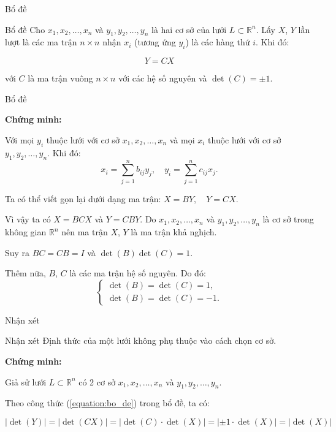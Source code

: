 \documentclass{beamer}
\numberwithin{equation}{section}
\begin{document}
\begin{frame}{Bổ đề}
\begin{block}{Bổ đề}
Cho $x_1, x_2, \ldots, x_n$ và $y_1, y_2, \ldots, y_n$ là hai cơ sở của lưới $L \subset \mathbb{R}^n$.
Lấy $X$, $Y$ lần lượt là các ma trận $n \times n$ nhận $x_i$ (tương ứng $y_i$) là các hàng thứ $i$.
Khi đó:

\begin{equation} \label{equation:bo_de}
Y = CX
\end{equation}

với $C$ là ma trận vuông $n \times n$ với các hệ số nguyên
và $\det(C) = \pm 1$.
\end{block}
\end{frame}
\begin{frame}{Bổ đề}

\textbf{Chứng minh:}

Với mọi $y_i$ thuộc lưới với cơ sở $x_1, x_2, \ldots, x_n$ và mọi $x_i$ thuộc lưới với cơ sở $y_1, y_2, \ldots, y_n$. Khi đó:
\[
x_i = \sum_{j=1}^n b_{ij} y_j, \quad y_i = \sum_{j=1}^n c_{ij} x_j.
\]

Ta có thể viết gọn lại dưới dạng ma trận:
$X = BY, \quad Y = CX.$

Vì vậy ta có $X = BCX$ và $Y = CBY$. Do $x_1, x_2, \ldots, x_n$ và $y_1, y_2, \ldots, y_n$ là cơ sở trong không gian $\mathbb{R}^n$ nên ma trận $X$, $Y$ là ma trận khả nghịch.

Suy ra $BC = CB = I$ và $\det(B) \det(C) = 1$.

Thêm nữa, $B$, $C$ là các ma trận hệ số nguyên. Do đó:
\[
\begin{cases}
\det(B) = \det(C) = 1, \\
\det(B) = \det(C) = -1.
\end{cases}
\]

\end{frame}
\begin{frame}{Nhận xét}

\begin{block}{Nhận xét}
Định thức của một lưới không phụ thuộc vào cách chọn cơ sở.
\end{block}

\textbf{Chứng minh:}

Giả sử lưới $L \subset \mathbb{R}^n$ có 2 cơ sở $x_1, x_2, \ldots, x_n$ và $y_1, y_2, \ldots, y_n$.

Theo công thức (\ref{equation:bo_de}) trong bổ đề, ta có:

\[
|\det(Y)| = |\det(CX)| = |\det(C) \cdot \det(X)| = |\pm 1 \cdot \det(X)| = |\det(X)|
\]

\end{frame}
\end{document}
